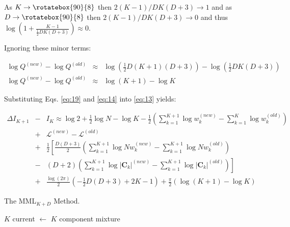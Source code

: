 \documentclass{elsarticle}
\newcommand{\vect}[1]{\boldsymbol{\mathbf{#1}}}
\def\infinity{\rotatebox{90}{8}}
\def\cov{C}
\def\veccov{\vect{\cov}}
\begin{document}
As $K \rightarrow \infinity$ then $2(K-1)/DK(D+3) \rightarrow 1$ and as $D \rightarrow \infinity$ then $2(K-1)/DK(D+3) \rightarrow 0$ and thus $\log{\left(1 + \frac{K - 1}{\frac{1}{2}DK(D + 3)}\right)} \approx 0$.

\noindent{}Ignoring these minor terms:

\begin{eqnarray}
  \log{Q^{(new)}} - \log{Q^{(old)}} &\approx& \log{\left(\frac{1}{2}D(K+1)(D + 3)\right)} - \log{\left(\frac{1}{2}DK(D + 3)\right)} \nonumber \\
  \log{Q^{(new)}} - \log{Q^{(old)}} &\approx& \log{(K + 1)} - \log{K}
  \label{eq:19}
\end{eqnarray}

\noindent{}Substituting Eqs. \ref{eq:19} and \ref{eq:14} into \ref{eq:13} yields:

\begin{eqnarray}
\Delta{}I_{K+1} &-& I_K \approx \log{2} %
    + \frac{1}{2}\log{N} - \log{K} - \frac{1}{2}\left(\sum_{k=1}^{K+1}\log{w_k^{(new)}} - \sum_{k=1}^{K}\log{w_k^{(old)}}\right) \nonumber \\ %
& +& \mathcal{L}^{(new)} - \mathcal{L}^{(old)} \nonumber \\ %
& +& \frac{1}{2}\left[\frac{D(D+3)}{2}\left(\sum_{k=1}^{K+1}\log{Nw_k^{(new)} - \sum_{k=1}^{K+1}\log{Nw_k^{(old)}}} \right) \right.\nonumber \\
&-& \left.\left(D+2\right)\left(\sum_{k=1}^{K+1}\log{|\veccov_k|^{(new)}} - \sum_{k=1}^{K+1}\log{|\veccov_k|^{(old)}}\right)\right] \nonumber \\
& +& \frac{\log(2\pi)}{2}(-\frac{1}{2}D(D+3) + 2K  - 1) + \frac{\pi}{2}\left(\log{(K + 1)} - \log{K}\right)
\end{eqnarray}

\begin{algorithm}[H]
\caption{The MML$_{K+D}$ Method.}
\label{alg:MMLKD}
\begin{algorithmic}[1]
 $K$ 
\State current $\leftarrow$ $K$ component mixture
\EndWhile
{} 
\end{algorithmic}
\end{algorithm}
\end{document}
